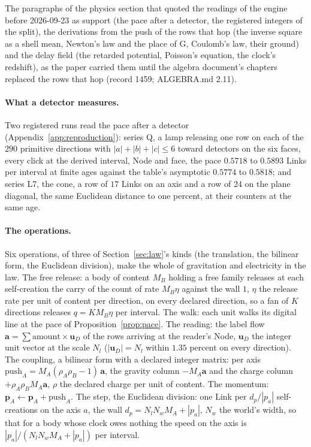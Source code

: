 The paragraphs of the physics section that quoted the readings of the engine before 2026-09-23 as support (the pace after a detector, the registered integers of the split), the derivations from the push of the rows that hop (the inverse square as a shell mean, Newton's law and the place of G, Coulomb's law, their ground) and the delay field (the retarded potential, Poisson's equation, the clock's redshift), as the paper carried them until the algebra document's chapters replaced the rows that hop (record 1459; ALGEBRA.md 2.11).

\paragraph{What a detector measures.} Two registered runs read the pace after a detector (Appendix~\ref{app:reproduction}): series Q, a lamp releasing one row on each of the $290$ primitive directions with $|a| + |b| + |c| \le 6$ toward detectors on the six faces, every click at the derived interval, Node and face, the pace $0.5718$ to $0.5893$ Links per interval at finite ages against the table's asymptotic $0.5774$ to $0.5818$; and series L7, the cone, a row of $17$ Links on an axis and a row of $24$ on the plane diagonal, the same Euclidean distance to one percent, at their counters at the same age.



\paragraph{The operations.} Six operations, of three of Section~\ref{sec:law}'s kinds (the translation, the bilinear form, the Euclidean division), make the whole of gravitation and electricity in the law. The free release: a body of content $M_B$ holding a free family releases at each self-creation the carry of the count of rate $M_B\eta$ against the wall $1$, $\eta$ the release rate per unit of content per direction, on every declared direction, so a fan of $K$ directions releases $q = K M_B\eta$ per interval. The walk: each unit walks its digital line at the pace of Proposition~\ref{prop:pace}. The reading: the label flow $\mathbf a = \sum \mathrm{amount} \times \mathbf u_D$ of the rows arriving at the reader's Node, $\mathbf u_D$ the integer unit vector at the scale $N_l$ ($|\mathbf u_D| = N_l$ within $1.35$ percent on every direction). The coupling, a bilinear form with a declared integer matrix: per axis $\mathrm{push}_A = M_A (\rho_A\rho_B - 1)\,\mathbf a$, the gravity column $-M_A \mathbf a$ and the charge column $+\rho_A\rho_B M_A \mathbf a$, $\rho$ the declared charge per unit of content. The momentum: $\mathbf p_A \leftarrow \mathbf p_A + \mathrm{push}_A$. The step, the Euclidean division: one Link per $d_p/|p_a|$ self-creations on the axis $a$, the wall $d_p = N_l N_w M_A + |p_a|$, $N_w$ the world's width, so that for a body whose clock owes nothing the speed on the axis is $|p_a|/(N_l N_w M_A + |p_a|)$ per interval.



